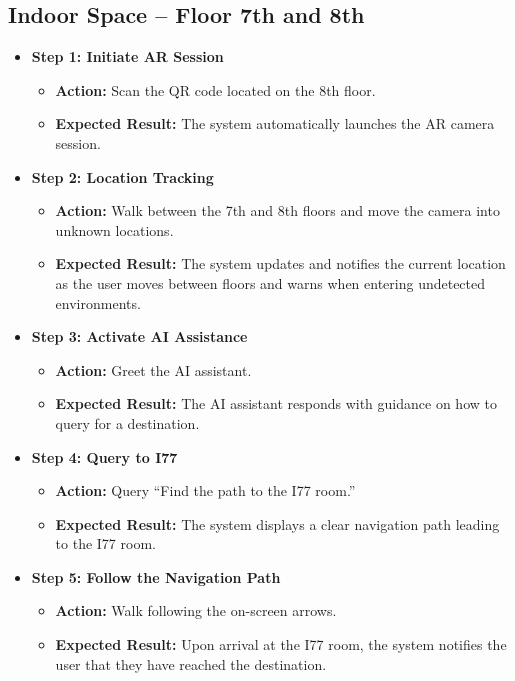 \subsection{Indoor Space -- Floor 7th and 8th}
\begin{itemize}
    \item \textbf{Step 1: Initiate AR Session}
    \begin{itemize}
        \item \textbf{Action:} Scan the QR code located on the 8th floor.
        \item \textbf{Expected Result:} The system automatically launches the AR camera session.
    \end{itemize}
    
    \item \textbf{Step 2: Location Tracking}
    \begin{itemize}
        \item \textbf{Action:} Walk between the 7th and 8th floors and move the camera into unknown locations.
        \item \textbf{Expected Result:} The system updates and notifies the current location as the user moves between floors and warns when entering undetected environments.
    \end{itemize}
    
    \item \textbf{Step 3: Activate AI Assistance}
    \begin{itemize}
        \item \textbf{Action:} Greet the AI assistant.
        \item \textbf{Expected Result:} The AI assistant responds with guidance on how to query for a destination.
    \end{itemize}
    
    \item \textbf{Step 4: Query to I77}
    \begin{itemize}
        \item \textbf{Action:} Query “Find the path to the I77 room.”
        \item \textbf{Expected Result:} The system displays a clear navigation path leading to the I77 room.
    \end{itemize}
    
    \item \textbf{Step 5: Follow the Navigation Path}
    \begin{itemize}
        \item \textbf{Action:} Walk following the on-screen arrows.
        \item \textbf{Expected Result:} Upon arrival at the I77 room, the system notifies the user that they have reached the destination.
    \end{itemize}
    

\end{itemize}
